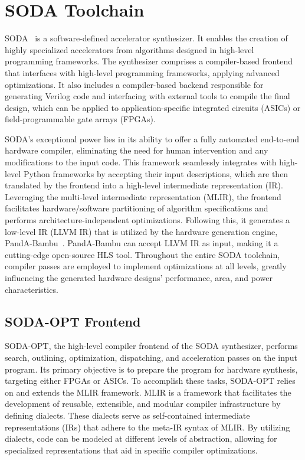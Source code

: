 \section{SODA Toolchain}
\label{sec:soda}%

SODA~\cite{9786533} is a software-defined accelerator synthesizer.
It enables the creation of highly specialized accelerators from algorithms designed in high-level programming frameworks.
The synthesizer comprises a compiler-based frontend that interfaces with high-level programming frameworks, applying advanced optimizations.
It also includes a compiler-based backend responsible for generating Verilog code and interfacing with external tools to compile the final design, which can be applied to application-specific integrated circuits (ASICs) or field-programmable gate arrays (FPGAs).

SODA's exceptional power lies in its ability to offer a fully automated end-to-end hardware compiler, eliminating the need for human intervention and any modifications to the input code.
This framework seamlessly integrates with high-level Python frameworks by accepting their input descriptions, which are then translated by the frontend into a high-level intermediate representation (IR).
Leveraging the multi-level intermediate representation (MLIR), the frontend facilitates hardware/software partitioning of algorithm specifications and performs architecture-independent optimizations.
Following this, it generates a low-level IR (LLVM IR) that is utilized by the hardware generation engine, PandA-Bambu~\cite{9586110}.
PandA-Bambu can accept LLVM IR as input, making it a cutting-edge open-source HLS tool.
Throughout the entire SODA toolchain, compiler passes are employed to implement optimizations at all levels, greatly influencing the generated hardware designs' performance, area, and power characteristics.

\subsection{SODA-OPT Frontend}
\label{subsec:soda_frontend}%

SODA-OPT, the high-level compiler frontend of the SODA synthesizer, performs search, outlining, optimization, dispatching, and acceleration passes on the input program.
Its primary objective is to prepare the program for hardware synthesis, targeting either FPGAs or ASICs.
To accomplish these tasks, SODA-OPT relies on and extends the MLIR framework.
MLIR is a framework that facilitates the development of reusable, extensible, and modular compiler infrastructure by defining dialects.
These dialects serve as self-contained intermediate representations (IRs) that adhere to the meta-IR syntax of MLIR.
By utilizing dialects, code can be modeled at different levels of abstraction, allowing for specialized representations that aid in specific compiler optimizations.


